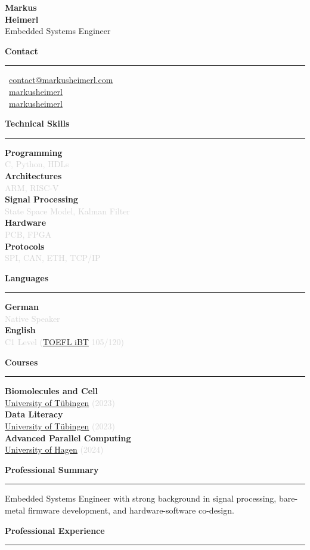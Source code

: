 \documentclass[a4paper,10pt]{article}
\newcommand{\cvsection}[1]{
    \vspace{12pt}
    {\large\bfseries\color{darkgray} #1}
    \vspace{4pt}
    \hrule
    \vspace{8pt}
}
\newcommand{\cvitem}[2]{
    \textbf{\color{darkgray}#1} \\
    \textcolor{lightgray}{\small #2} \\[2pt]
}
\newcommand{\cvitemlast}[2]{
    \textbf{\color{darkgray}#1} \\
    \textcolor{lightgray}{\small #2}
}
\begin{document}
\setlength{\columnsep}{0.8cm}
\begin{paracol}{2}


\vspace{0.5cm}

\begin{center}
    {\LARGE\bfseries\color{darkgray} Markus} \\[4pt]
    {\LARGE\bfseries\color{primaryblue} Heimerl} \\[8pt]
    {\small\color{darkgray} Embedded Systems Engineer}
\end{center}

\vspace{0.6cm}

\cvsection{Contact}
\small
\faEnvelope\, \href{mailto:contact@markusheimerl.com}{contact@markusheimerl.com} \\[5pt]
\faLinkedin\, \href{https://www.linkedin.com/in/markusheimerl/}{markusheimerl} \\[5pt]
\faGithub\, \href{https://github.com/markusheimerl}{markusheimerl}

\cvsection{Technical Skills}
\cvitem{Programming}{C, Python, HDLs}
\cvitem{Architectures}{ARM, RISC-V}
\cvitem{Signal Processing}{State Space Model, Kalman Filter}
\cvitem{Hardware}{PCB, FPGA}
\cvitemlast{Protocols}{SPI, CAN, ETH, TCP/IP}

\cvsection{Languages}
\cvitem{German}{Native Speaker}
\cvitemlast{English}{C1 Level (\href{https://www.ets.org/toefl.html}{TOEFL iBT} 105/120)}

\cvsection{Courses}
\cvitem{Biomolecules and Cell}{\href{https://uni-tuebingen.de/}{University of Tübingen} (2023)}
\cvitem{Data Literacy}{\href{https://uni-tuebingen.de/}{University of Tübingen} (2023)}
\cvitemlast{Advanced Parallel Computing}{\href{https://www.fernuni-hagen.de/}{University of Hagen} (2024)}

\vspace{0.5cm}

\switchcolumn

\vspace{0.5cm}

\cvsection{Professional Summary}
Embedded Systems Engineer with strong background in signal processing, bare-metal firmware development, and hardware-software co-design.

\cvsection{Professional Experience}


\end{paracol}
\end{document}
